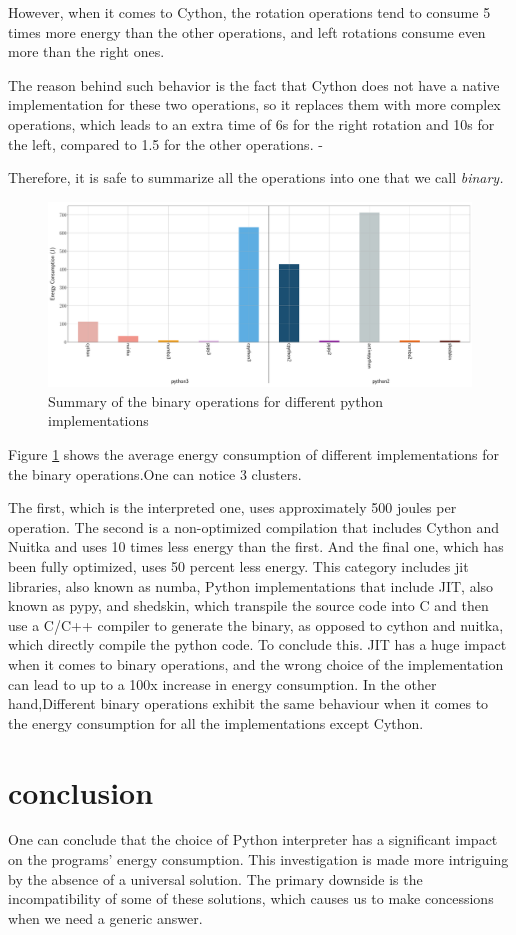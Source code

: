 However, when it comes to Cython, the rotation operations tend to consume 5 times more energy than the other operations, and left rotations consume even more than the right ones.

The reason behind such behavior is the fact that Cython does not have a native implementation for these two operations, so it replaces them with more complex operations, which leads to an extra time of 6s for the right rotation and 10s for the left, compared to 1.5 for the other operations. -

Therefore, it is safe to summarize all the operations into one that we call \em{binary}.

\begin{figure}
    \centering
    \includegraphics[width=\linewidth]{imgs/bitopts_mean}
    \caption{Summary of the binary operations for different python implementations }
    \label{fig:bitops}
\end{figure}
Figure \ref{fig:bitops}  shows the average energy consumption of different implementations for the binary operations.One can notice 3 clusters.

The first, which is the interpreted one, uses approximately 500 joules per operation. The second is a non-optimized compilation that includes Cython and Nuitka and uses 10 times less energy than the first. And the final one, which has been fully optimized, uses 50 percent less energy. This category includes jit libraries, also known as numba, Python implementations that include JIT, also known as pypy, and shedskin, which transpile the source code into C and then use a C/C++ compiler to generate the binary, as opposed to cython and nuitka, which directly compile the python code.
To conclude this. JIT has a huge impact when it comes to binary operations, and the wrong choice of the implementation can lead to up to a 100x increase in energy consumption. In the other hand,Different binary operations exhibit the same behaviour when it comes to the energy consumption for all the implementations except Cython.

\section{conclusion}
One can conclude that the choice of Python interpreter has a significant impact on the programs' energy consumption.
This investigation is made more intriguing by the absence of a universal solution.
The primary downside is the incompatibility of some of these solutions, which causes us to make concessions when we need a generic answer.



